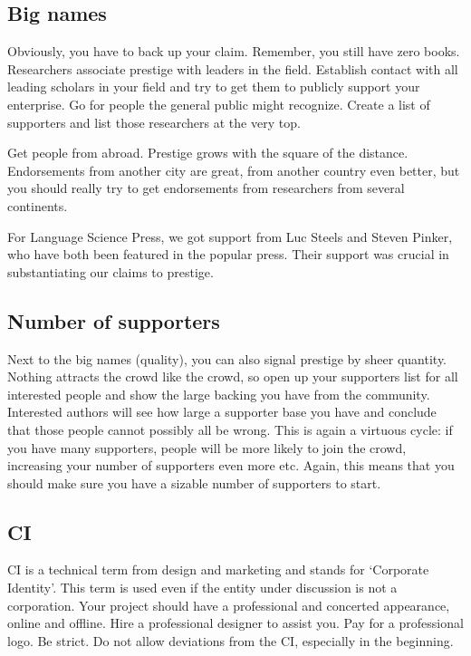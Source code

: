 \documentclass[output=guidelines,guidelines] {langscibook}
\begin{document}
\subsection{Big names}
Obviously, you have to back up your claim. Remember, you still have zero books. Researchers associate prestige with leaders in the field. Establish contact with all leading scholars in your field and try to get them to publicly support your enterprise. Go for people the general public might recognize. Create a list of supporters and list those researchers at the very top.  

Get people from abroad. Prestige grows with the square of the distance. Endorsements from another city are great, from another country even better, but you should really try to get endorsements from researchers from several continents. 

For Language Science Press, we got support from Luc Steels and Steven Pinker, who have both been featured in the popular press. Their support was crucial in substantiating our claims to prestige. 

\subsection{Number of supporters}
Next to the big names (quality), you can also signal prestige by sheer quantity. Nothing attracts the crowd like the crowd, so open up your supporters list for all interested people and show the large backing you have from the community. Interested authors will see how large a supporter base you have and conclude that those people cannot possibly all be wrong. This is again a virtuous cycle: if you have many supporters, people will be more likely to join the crowd, increasing your number of supporters even more etc. Again, this means that you should make sure you have a sizable number of supporters to start. 


 
\subsection{CI}
CI is a technical term from design and marketing and stands for `Corporate Identity'. This term is used even if the entity under discussion is not a corporation. Your project should have a professional and concerted appearance, online and offline. Hire a professional designer to assist you. Pay for a professional logo. Be strict. Do not allow deviations from the CI, especially in the beginning.
\end{document}

